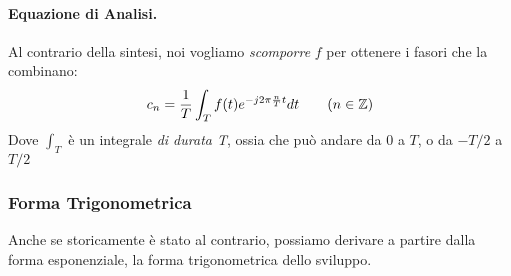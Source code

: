 \paragraph{Equazione di Analisi.} Al contrario della sintesi, noi vogliamo \textit{scomporre} $f$ per ottenere i fasori che la combinano:
\begin{equation}
    c_n = \frac{1}{T} \int_{T} f(t)e^{-j2\pi \frac{n}{T}t} dt \tag{$n \in \mathbb{Z}$}
\end{equation}
Dove $\int_{T}$ è un integrale \textit{di durata T}, ossia che può andare da $0$ a $T$, o da $-T/2$ a $T/2$

\subsubsection{Forma Trigonometrica}
Anche se storicamente è stato al contrario, possiamo derivare a partire dalla forma esponenziale, la forma trigonometrica dello sviluppo.

